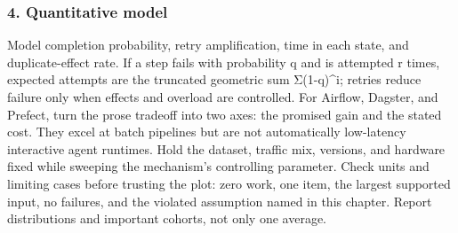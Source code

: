 \subsubsection*{4. Quantitative model}
Model completion probability, retry amplification, time in each state, and duplicate-effect rate. If a step fails with probability q and is attempted r times, expected attempts are the truncated geometric sum Σ(1-q)\textasciicircum{}i; retries reduce failure only when effects and overload are controlled.
For Airflow, Dagster, and Prefect, turn the prose tradeoff into two axes: the promised gain and the stated cost. They excel at batch pipelines but are not automatically low-latency interactive agent runtimes. Hold the dataset, traffic mix, versions, and hardware fixed while sweeping the mechanism's controlling parameter.
Check units and limiting cases before trusting the plot: zero work, one item, the largest supported input, no failures, and the violated assumption named in this chapter. Report distributions and important cohorts, not only one average.
